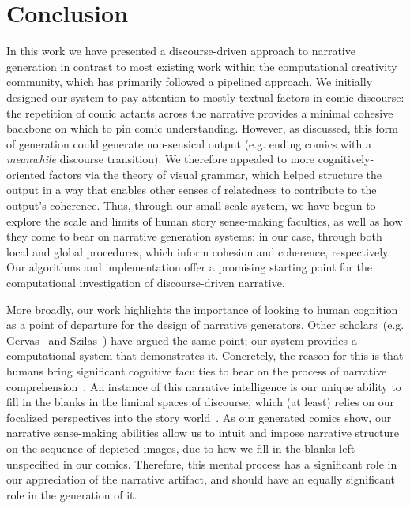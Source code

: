 \section{Conclusion}

In this work we have presented a discourse-driven approach to narrative 
generation in contrast to most existing work within the computational 
creativity community, which has primarily followed a pipelined approach.
We initially designed our system to pay attention to mostly textual
factors in comic discourse: the repetition of comic actants across the
narrative provides a minimal cohesive backbone on which to pin comic 
understanding.
%
However, as discussed, this form of generation could generate non-sensical
output (e.g. ending comics with a \emph{meanwhile} discourse transition). 
We therefore appealed to more cognitively-oriented factors via the theory
of visual grammar, which helped structure the output in a way that enables
other senses of relatedness to contribute to the output's coherence.
%
Thus, through our small-scale system, we have begun to explore the scale and
limits of human story sense-making faculties, as well as how they come to
bear on narrative generation systems: in our case, through both local and 
global procedures, which inform cohesion and coherence, respectively. 
%
Our algorithms and implementation offer a promising starting point for the
computational investigation of discourse-driven narrative.

More broadly, our work highlights the importance of looking to human
cognition as a point of departure for the design of narrative generators.
Other scholars~(e.g. Gervas~\cite{gervas2009computational} and
Szilas~\cite{szilas2010requirements}) have argued the same point; our
system provides a computational system that demonstrates it. Concretely,
the reason for this is that humans bring significant cognitive faculties to
bear on the process of narrative
comprehension~\cite{herman2013storytelling}.  An instance of this narrative
intelligence is our unique ability to fill in the blanks in the liminal
spaces of discourse, which (at least) relies on  our focalized perspectives
into the story world~\cite{genette1983narrative}.  As our generated comics
show, our narrative sense-making abilities allow us to intuit and impose
narrative structure on the sequence of depicted images, due to how we fill
in the blanks left unspecified in our comics. Therefore, this mental
process has a significant role in our appreciation of the narrative
artifact, and should have an equally significant role in the generation of
it.
